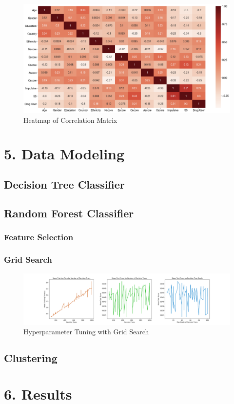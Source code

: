 \documentclass[10pt]{article}
\begin{document}
\begin{figure}[H]
\caption{Heatmap of Correlation Matrix}
\centering
\includegraphics[scale=0.25]{heatmap.png}
\end{figure}

\section*{5. Data Modeling}

\subsection*{Decision Tree Classifier}

\subsection*{Random Forest Classifier}

\subsubsection*{Feature Selection}

\subsubsection*{Grid Search}

\begin{figure}[H]
\caption{Hyperparameter Tuning with Grid Search }
\centering
\includegraphics[scale=0.4]{gridsearch.png}
\end{figure}

\subsection*{Clustering}

\section*{6. Results}
\end{document}
